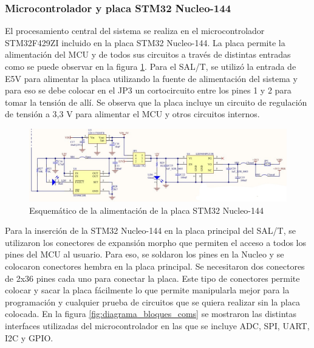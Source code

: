 \subsubsection{Microcontrolador y placa STM32 Nucleo-144}

El procesamiento central del sistema se realiza en el microcontrolador STM32F429ZI incluido en la placa STM32 Nucleo-144. La placa permite la alimentación del MCU y de todos sus circuitos a través de distintas entradas como se puede observar en la figura \ref{fig:nucleo_pw}. Para el SAL/T, se utilizó la entrada de E5V para alimentar la placa utilizando la fuente de alimentación del sistema y para eso se debe colocar en el JP3 un cortocircuito entre los pines 1 y 2 para tomar la tensión de allí. Se observa que la placa incluye un circuito de regulación de tensión a 3,3 V para alimentar el MCU y otros circuitos internos. 


\begin{figure}[H]
    \centering
    \includegraphics[width = \linewidth]{img/nucleo_pw.jpeg}
    \caption{Esquemático de la alimentación de la placa STM32 Nucleo-144}
    \label{fig:nucleo_pw}
\end{figure}    

Para la inserción de la STM32 Nucleo-144 en la placa principal del SAL/T, se utilizaron los conectores de expansión morpho que permiten el acceso a todos los pines del MCU al usuario. Para eso, se soldaron los pines en la Nucleo y se colocaron conectores hembra en la placa principal. Se necesitaron dos conectores de 2x36 pines cada uno para conectar la placa. Este tipo de conectores permite colocar y sacar la placa fácilmente lo que permite manipularla mejor para la programación y cualquier prueba de circuitos que se quiera realizar sin la placa colocada. En la figura \ref{fig:diagrama_bloques_coms} se mostraron las distintas interfaces utilizadas del microcontrolador en las que se incluye ADC, SPI, UART, I2C y GPIO. 